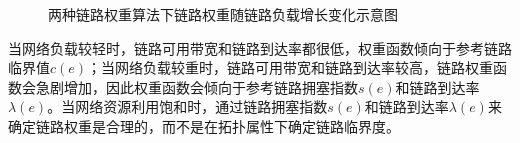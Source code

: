 \begin{figure}[t] %
    \centering
    \hspace{0.00\linewidth}
    \hspace{0.00\linewidth}
    \caption{两种链路权重算法下链路权重随链路负载增长变化示意图} 
    \label{fig:ch3:link-weight-function}
\end{figure}


当网络负载较轻时，链路可用带宽和链路到达率都很低，权重函数倾向于参考链路临界值$c\left(e\right)$；当网络负载较重时，链路可用带宽和链路到达率较高，链路权重函数会急剧增加，因此权重函数会倾向于参考链路拥塞指数$s\left(e\right)$和链路到达率$\lambda\left(e\right)$。当网络资源利用饱和时，通过链路拥塞指数$s\left(e\right)$和链路到达率$\lambda\left(e\right)$来确定链路权重是合理的，而不是在拓扑属性下确定链路临界度。

